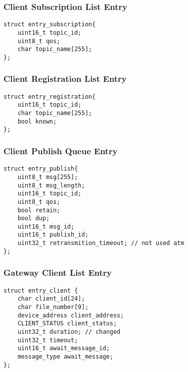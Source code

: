 \subsubsection{Client Subscription List Entry}\label{sec:clientsubscriptionlistentry}
\begin{small}
	\begin{verbatim}
struct entry_subscription{
	uint16_t topic_id;
	uint8_t qos;
	char topic_name[255];
};
	\end{verbatim}
\end{small}
\subsubsection{Client Registration List Entry}\label{sec:clientregistrationlistentry}
\begin{small}
	\begin{verbatim}
struct entry_registration{
	uint16_t topic_id;
	char topic_name[255];
	bool known;
};
	\end{verbatim}
\end{small}
\subsubsection{Client Publish Queue Entry}\label{sec:clientpublishqueueentry}
\begin{small}
	\begin{verbatim}
struct entry_publish{
	uint8_t msg[255];
	uint8_t msg_length;
	uint16_t topic_id;
	uint8_t qos;
	bool retain;
	bool dup;
	uint16_t msg_id;
	uint16_t publish_id;
	uint32_t retransmition_timeout; // not used atm
};
	\end{verbatim}
\end{small}
\subsubsection{Gateway Client List Entry}\label{sec:gatewayclientlistentry}
\begin{small}
	\begin{verbatim}
struct entry_client {
	char client_id[24];
	char file_number[9];
	device_address client_address;
	CLIENT_STATUS client_status;
	uint32_t duration; // changed
	uint32_t timeout;
	uint16_t await_message_id;
	message_type await_message;
};
	\end{verbatim}
\end{small}
